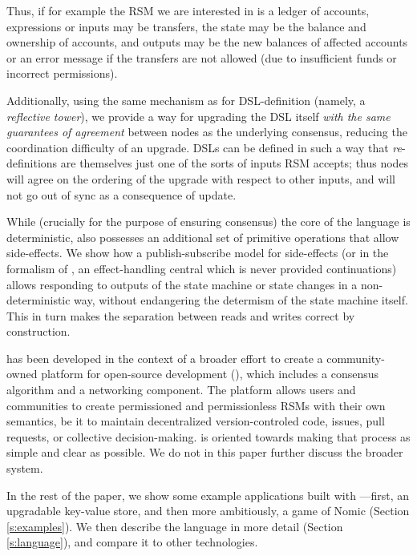 Thus, if for example the RSM we are interested
in is a ledger of accounts, expressions or inputs may be transfers, the
state may be the balance and ownership of accounts, and outputs may be the new
balances of affected accounts or an error message if the transfers are not
allowed (due to insufficient funds or incorrect permissions).

Additionally, using the same mechanism as for DSL-definition (namely, a
\emph{reflective tower}), we provide a way for upgrading the DSL itself
\emph{with the same guarantees of agreement} between nodes as the underlying
consensus, reducing the coordination difficulty of an upgrade. DSLs can be
defined in such a way that \emph{re}-definitions are themselves just one of the
sorts of inputs RSM accepts; thus nodes will agree on the ordering of the
upgrade with respect to other inputs, and will not go out of sync as a
consequence of update.

While (crucially for the purpose of ensuring consensus) the core of the language
is deterministic, \rad also possesses an additional set of primitive operations
that allow side-effects. We show how a publish-subscribe model for side-effects
(or in the formalism of \cite{Cartwright1994}, an effect-handling central which
is never provided continuations) allows responding to outputs of the state
machine or state changes in a non-deterministic way, without endangering the
determism of the state machine itself. This in turn makes the separation between
reads and writes correct by construction.

\rad has been developed in the context of a broader effort to create a
community-owned platform for open-source development (\oscoin{}), which
includes a consensus algorithm and a networking component. The \oscoin{}
platform allows users and communities to create permissioned and permissionless
RSMs with their own semantics, be it to maintain decentralized
version-controled code, issues, pull requests, or collective decision-making. \rad is
oriented towards making that process as simple and clear as possible. We do
not in this paper further discuss the broader \oscoin{} system.

In the rest of the paper, we show some example applications built with
\rad---first, an upgradable key-value store, and then more ambitiously, a game
of Nomic (Section \ref{s:examples}). We then describe the language in more
detail (Section \ref{s:language}), and compare it to other technologies.
